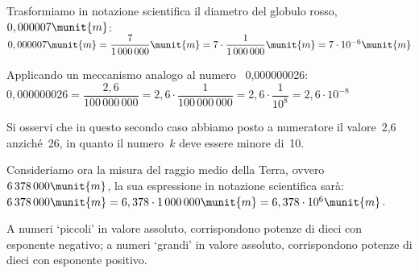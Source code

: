 Trasformiamo in notazione scientifica il diametro del globulo rosso, 
~\(0,000007\munit{m}\): \\
\(0,000007\munit{m}=\dfrac{7}{1\,000\,000}\munit{m}=
  7\cdot\dfrac{1}{1\,000\,000}\munit{m}=
  7\cdot10^{-6}\munit{m}\)

\vspace{.5em}
Applicando un meccanismo analogo al numero ~0,000000026: \\ 
\(0,000000026=\dfrac{2,6}{100\,000\,000}=
  2,6\cdot\dfrac{1}{100\,000\,000}=
  2,6\cdot\dfrac{1}{10^8}=2,6\cdot10^{-8}\)

Si osservi che in questo secondo caso abbiamo posto a numeratore il 
valore~2,6 anziché~26, in quanto il numero~\(k\) deve essere minore di~10.

Consideriamo ora la misura del raggio medio della Terra, 
ovvero~\(6\,378\,000\munit{m}\),
la sua espressione in notazione scientifica sarà: \\ 
\(6\,378\,000\munit{m} = 6,378\cdot1\,000\,000\munit{m} = 
6,378\cdot10^6\munit{m}\).


{\notesp}


\begin{osservazione}{}{}
A numeri `piccoli' in valore assoluto, corrispondono potenze di dieci con 
esponente negativo; 
a numeri `grandi' in valore assoluto, corrispondono potenze di dieci con 
esponente positivo.
\end{osservazione}


